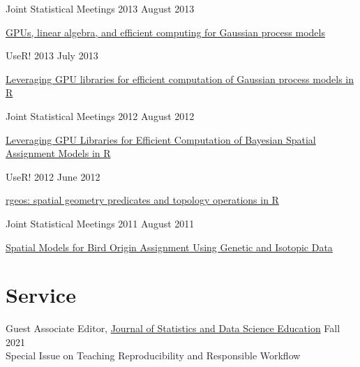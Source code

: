 \documentclass[margin,line]{res}
\begin{document}
\begin{resume}
Joint Statistical Meetings 2013 \hfill August 2013
\begin{list1}
\item[] \href{https://github.com/rundel/Presentations/tree/master/JSM%202013}{GPUs, linear algebra, and efficient computing for Gaussian process models}
\end{list1}
\vspace{-3mm}

UseR! 2013 \hfill July 2013
\begin{list1}
\item[] \href{https://github.com/rundel/Presentations/tree/master/UseR2013}{Leveraging GPU libraries for efficient computation of Gaussian process models in R}
\end{list1}
\vspace{-3mm}

Joint Statistical Meetings 2012 \hfill August 2012
\begin{list1}
\item[] \href{https://github.com/rundel/Presentations/tree/master/JSM%202012}{Leveraging GPU Libraries for Efficient Computation of Bayesian Spatial Assignment Models in R}
\end{list1}
\vspace{-3mm}

UseR! 2012 \hfill June 2012
\begin{list1}
\item[] \href{https://github.com/rundel/Presentations/tree/master/UseR2012}{rgeos: spatial geometry predicates and topology operations in R}
\end{list1}
\vspace{-3mm}

Joint Statistical Meetings 2011 \hfill August 2011
\begin{list1}
\item[] \href{https://github.com/rundel/Presentations/tree/master/JSM%202011}{Spatial Models for Bird Origin Assignment Using Genetic and Isotopic Data}
\end{list1}
\vspace{-3mm}

\vspace{4mm}

\pagebreak

\section{\sc Service}

Guest Associate Editor, \href{https://www.tandfonline.com/action/journalInformation?show=aimsScope&journalCode=ujse20}{Journal of Statistics and Data Science Education} \hfill Fall 2021\\
Special Issue on Teaching Reproducibility and Responsible Workflow


\end{resume}
\end{document}
